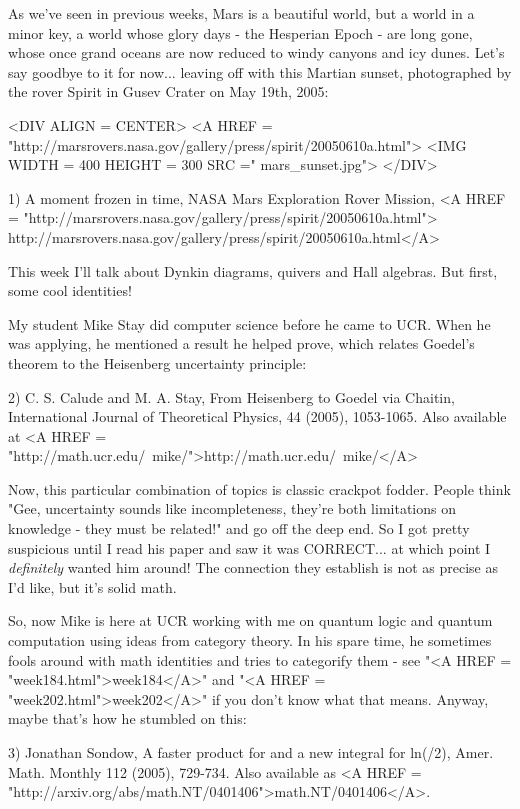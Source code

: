 


As we've seen in previous weeks, Mars is a beautiful world, but a
world in a minor key, a world whose glory days - the Hesperian Epoch -
are long gone, whose once grand oceans are now reduced to windy
canyons and icy dunes.  Let's say goodbye to it for now... leaving off
with this Martian sunset, photographed by the rover Spirit in Gusev
Crater on May 19th, 2005:

<DIV ALIGN = CENTER>
<A HREF = "http://marsrovers.nasa.gov/gallery/press/spirit/20050610a.html">
<IMG WIDTH = 400 HEIGHT = 300 SRC =" mars_sunset.jpg">
</DIV>

1) A moment frozen in time, NASA Mars Exploration Rover Mission,
<A HREF = "http://marsrovers.nasa.gov/gallery/press/spirit/20050610a.html">
http://marsrovers.nasa.gov/gallery/press/spirit/20050610a.html</A>

This week I'll talk about Dynkin diagrams, quivers and Hall algebras. 
But first, some cool identities!

My student Mike Stay did computer science before he came to UCR.  
When he was applying, he mentioned a result he helped prove, which 
relates Goedel's theorem to the Heisenberg uncertainty principle:

2) C. S. Calude and M. A. Stay, From Heisenberg to Goedel via Chaitin,
International Journal of Theoretical Physics, 44 (2005), 1053-1065.
Also available at <A HREF = "http://math.ucr.edu/~mike/">http://math.ucr.edu/~mike/</A>    

Now, this particular combination of topics is classic crackpot fodder.
People think "Gee, uncertainty sounds like incompleteness, they're
both limitations on knowledge - they must be related!" and go off the 
deep end.  So I got pretty suspicious until I read his paper and 
saw it was CORRECT... at which point I \emph{definitely} wanted him around!  
The connection they establish is not as precise as I'd like, but it's
solid math.

So, now Mike is here at UCR working with me on 
quantum logic and quantum computation using ideas from category
theory.   In his spare time, he 
sometimes fools around with math identities and tries to categorify 
them - see "<A HREF = "week184.html">week184</A>" 
and "<A HREF = "week202.html">week202</A>" if you don't 
know what that means.  Anyway, maybe that's how he stumbled on this: 

3) Jonathan Sondow, A faster product for \pi  and a new integral
for ln(\pi /2), Amer. Math. Monthly 112 (2005), 729-734.  Also 
available as <A HREF = "http://arxiv.org/abs/math.NT/0401406">math.NT/0401406</A>.

